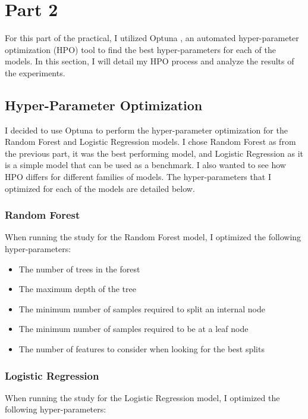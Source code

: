 \documentclass{article}
\begin{document}
\section{Part 2}
For this part of the practical, I utilized Optuna \cite{optuna_2019}, an automated hyper-parameter optimization (HPO) tool to find the best hyper-parameters for each of the models. In this section, I will detail my HPO process and analyze the results of the experiments.

\subsection{Hyper-Parameter Optimization}
I decided to use Optuna to perform the hyper-parameter optimization for the Random Forest and Logistic Regression models. I chose Random Forest as from the previous part, it was the best performing model, and Logistic Regression as it is a simple model that can be used as a benchmark. I also wanted to see how HPO differs for different families of models. The hyper-parameters that I optimized for each of the models are detailed below.

\subsubsection{Random Forest}
When running the study for the Random Forest model, I optimized the following hyper-parameters:

\begin{itemize}
  \item {} The number of trees in the forest
  \item {} The maximum depth of the tree
  \item {} The minimum number of samples required to split an internal node
  \item {} The minimum number of samples required to be at a leaf node
  \item {} The number of features to consider when looking for the best splits
\end{itemize}

\subsubsection{Logistic Regression}
When running the study for the Logistic Regression model, I optimized the following hyper-parameters:
\end{document}
